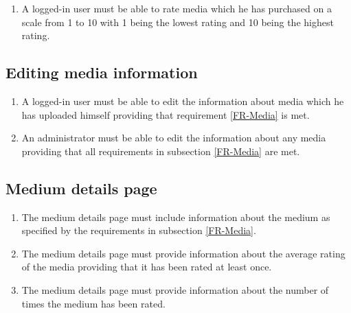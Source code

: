 \begin{enumerate}[label=FR-\twodigits*, resume]
	\item A logged-in user must be able to rate media which he has purchased on a scale from 1 to 10 with 1 being the lowest rating and 10 being the highest rating.
\end{enumerate}

\subsection{Editing media information}

\begin{enumerate}[label=FR-\twodigits*, resume]
	\item A logged-in user must be able to edit the information about media which he has uploaded himself providing that requirement \ref{FR-Media} is met.
	\item An administrator must be able to edit the information about any media providing that all requirements in subsection \ref{FR-Media} are met.
\end{enumerate}
			
\subsection {Medium details page}

\begin{enumerate}[label=FR-\twodigits*, resume]
	\item The medium details page must include information about the medium as specified by the requirements in subsection \ref{FR-Media}.
	\item The medium details page must provide information about the average rating of the media providing that it has been rated at least once.
	\item The medium details page must provide information about the number of times the medium has been rated.
\end{enumerate}
			

% 